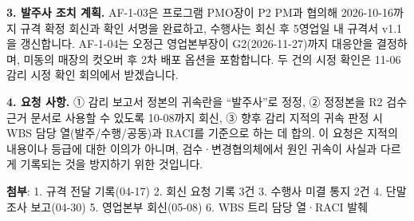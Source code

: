 \documentclass[10pt,a4paper]{article}
\begin{document}
\begin{fieldbox}
\begin{itemize}
\end{itemize}
\textbf{3. 발주사 조치 계획.} AF-1-03은 프로그램 PMO장이 P2 PM과 협의해 2026-10-16까지 규격 확정 회신과 확인 서명을 완료하고, 수행사는 회신 후 5영업일 내 규격서 v1.1을 갱신합니다. AF-1-04는 오정근 영업본부장이 G2(2026-11-27)까지 대응안을 결정하며, 미동의 매장의 컷오버 후 2차 배포 옵션을 포함합니다. 두 건의 시정 확인은 11-06 감리 시정 확인 회의에서 받겠습니다.\par
\textbf{4. 요청 사항.} ① 감리 보고서 정본의 귀속란을 “발주사”로 정정, ② 정정본을 R2 검수 근거 문서로 사용할 수 있도록 10-08까지 회신, ③ 향후 감리 지적의 귀속 판정 시 WBS 담당 열(발주/수행/공동)과 RACI를 기준으로 하는 데 합의. 이 요청은 지적의 내용이나 등급에 대한 이의가 아니며, 검수·변경협의체에서 원인 귀속이 사실과 다르게 기록되는 것을 방지하기 위한 것입니다.\par
\textbf{첨부}: 1. 규격 전달 기록(04-17) 2. 회신 요청 기록 3건 3. 수행사 미결 통지 2건 4. 단말 조사 보고(04-30) 5. 영업본부 회신(05-08) 6. WBS 트리 담당 열·RACI 발췌\par
\fi
\end{fieldbox}
\end{document}
